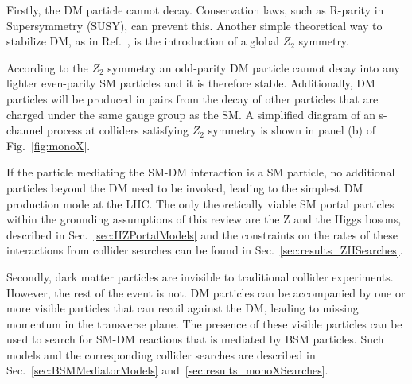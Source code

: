\begin{textbox}[!h]
\begin{marginnote}[]
\end{marginnote}

Firstly, the DM particle cannot decay. Conservation laws, such as R-parity in Supersymmetry (SUSY), can prevent this. Another simple theoretical way to stabilize DM, as in Ref.~\cite{Batell:2010bp}, is the introduction of a global $Z_2$ symmetry. 
\begin{marginnote}[]
\end{marginnote}
According to the $Z_2$ symmetry an odd-parity DM particle cannot decay into any lighter even-parity SM particles and it is therefore stable. 
Additionally, DM particles will be produced in pairs from the decay of other particles that are charged under the same gauge group as the SM.
A simplified diagram of an s-channel process at colliders satisfying $Z_2$ symmetry is shown in panel (b) of Fig.~\ref{fig:monoX}.


If the particle mediating the SM-DM interaction is a SM particle, no additional particles beyond the DM need to be invoked, leading to the simplest DM production mode at the LHC. The only theoretically viable SM portal particles within the grounding assumptions of this review are the Z and the Higgs bosons, described in Sec.~\ref{sec:HZPortalModels} and the constraints on the rates of these interactions from collider searches can be found in Sec.~\ref{sec:results_ZHSearches}. 

Secondly, dark matter particles are invisible to traditional collider experiments. However, the rest of the event is not. DM particles can be accompanied by one or more visible particles that can recoil against the DM, leading to missing momentum in the transverse plane. The presence of these visible particles can be used to search for SM-DM reactions that is mediated by BSM particles. Such models and the corresponding collider searches are described in Sec.~\ref{sec:BSMMediatorModels} and~\ref{sec:results_monoXSearches}. 


\end{textbox}
